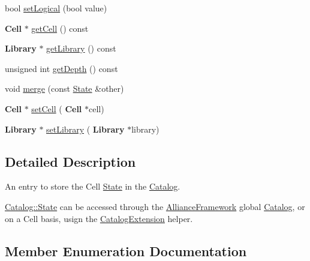 \begin{DoxyCompactItemize}
\item 
bool \mbox{\hyperlink{classCRL_1_1Catalog_1_1State_af41327abeb4e7646ef5cafabe8eeabd0}{set\+Logical}} (bool value)
\item 
\textbf{ Cell} $\ast$ \mbox{\hyperlink{classCRL_1_1Catalog_1_1State_a0cc5ef54176f8207ef4e723eed62c35e}{get\+Cell}} () const
\item 
\textbf{ Library} $\ast$ \mbox{\hyperlink{classCRL_1_1Catalog_1_1State_a89dad78f1829b1ee3177f61e2f73d6c6}{get\+Library}} () const
\item 
unsigned int \mbox{\hyperlink{classCRL_1_1Catalog_1_1State_a0232ad6dcfda1e2801f788deaad83e08}{get\+Depth}} () const
\item 
void \mbox{\hyperlink{classCRL_1_1Catalog_1_1State_a41fde67f1b88de06cae113a0d8108f25}{merge}} (const \mbox{\hyperlink{classCRL_1_1Catalog_1_1State}{State}} \&other)
\item 
\textbf{ Cell} $\ast$ \mbox{\hyperlink{classCRL_1_1Catalog_1_1State_a156714ad3fe2e5bb8ad8549d101526fe}{set\+Cell}} (\textbf{ Cell} $\ast$cell)
\item 
\textbf{ Library} $\ast$ \mbox{\hyperlink{classCRL_1_1Catalog_1_1State_a821ac2ae33f0045232cab612ab12f84b}{set\+Library}} (\textbf{ Library} $\ast$library)
\end{DoxyCompactItemize}


\subsection{Detailed Description}
An entry to store the Cell \mbox{\hyperlink{classCRL_1_1Catalog_1_1State}{State}} in the \mbox{\hyperlink{classCRL_1_1Catalog}{Catalog}}. 

\mbox{\hyperlink{classCRL_1_1Catalog_1_1State}{Catalog\+::\+State}} can be accessed through the \mbox{\hyperlink{classCRL_1_1AllianceFramework}{Alliance\+Framework}} global \mbox{\hyperlink{classCRL_1_1Catalog}{Catalog}}, or on a Cell basis, usign the \mbox{\hyperlink{classCRL_1_1CatalogExtension}{Catalog\+Extension}} helper. 

\subsection{Member Enumeration Documentation}
\mbox{\label{classCRL_1_1Catalog_1_1State_a625003526d38ac7500b4ad7de35e2d74}} 
